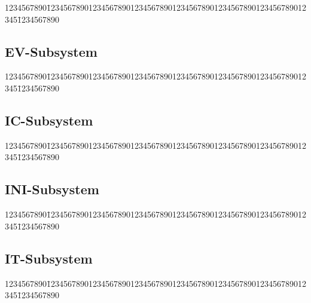 {\small
\begin{tabbing}
1234567890\=12345678901234567890123456789012345678901234567890123456789012345\=1234567890 \kill
 

 
\end{tabbing}
}

\subsection{EV-Subsystem}
 
{\small
\begin{tabbing}
1234567890\=12345678901234567890123456789012345678901234567890123456789012345\=1234567890 \kill
 

 
\end{tabbing}
}

\subsection{IC-Subsystem}
 
{\small
\begin{tabbing}
1234567890\=12345678901234567890123456789012345678901234567890123456789012345\=1234567890 \kill
 

 
\end{tabbing}
}

\subsection{INI-Subsystem}
 
{\small
\begin{tabbing}
1234567890\=12345678901234567890123456789012345678901234567890123456789012345\=1234567890 \kill
 

 
\end{tabbing}
}

\subsection{IT-Subsystem}
 
{\small
\begin{tabbing}
1234567890\=12345678901234567890123456789012345678901234567890123456789012345\=1234567890 \kill
 

 
\end{tabbing}
}

